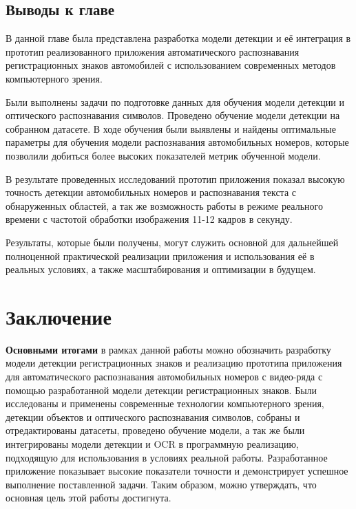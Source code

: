 \documentclass[a4paper,12pt]{article}
\begin{document}
\subsection{Выводы к главе}

В данной главе была представлена разработка модели детекции и её интеграция в прототип реализованного приложения автоматического распознавания регистрационных знаков автомобилей с использованием современных методов компьютерного зрения.

Были выполнены задачи по подготовке данных для обучения модели детекции и оптического распознавания символов. Проведено обучение модели детекции на собранном датасете. В ходе обучения были выявлены и найдены оптимальные параметры для обучения модели распознавания автомобильных номеров, которые позволили добиться более высоких показателей метрик обученной модели. 

В результате проведенных исследований прототип приложения показал высокую точность детекции автомобильных номеров и распознавания текста с обнаруженных областей, а так же возможность работы в режиме реального времени с частотой обработки изображения 11-12 кадров в секунду.

Результаты, которые были получены, могут служить основной для дальнейшей полноценной практической реализации приложения и использования её в реальных условиях, а также масштабирования и оптимизации в будущем. 


\newpage
\section*{Заключение}

\textbf{Основными итогами} в рамках данной работы можно обозначить разработку модели детекции регистрационных знаков и реализацию прототипа приложения для автоматического распознавания автомобильных номеров с видео-ряда с помощью разработанной модели детекции регистрационных знаков. Были исследованы и применены современные технологии компьютерного зрения, детекции объектов и оптического распознавания символов, собраны и отредактированы датасеты, проведено обучение модели, а так же были интегрированы модели детекции и OCR в программную реализацию, подходящую для использования в условиях реальной работы. 
Разработанное приложение показывает высокие показатели точности и демонстрирует успешное выполнение поставленной задачи. 
Таким образом, можно утверждать, что основная цель этой работы достигнута.
\end{document}
